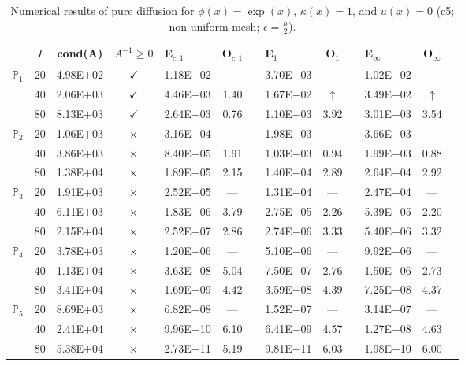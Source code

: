 \begin{table}[H]
\centering
\caption{Numerical results of pure diffusion for $\phi(x)=\exp(x)$, $\kappa(x)=1$, and $u(x)=0$ (c5; non-uniform mesh; $\epsilon=\frac{h}{2}$).}
\begin{tabular}{@{}l c c c l c c l c c l c c@{}}
\toprule
 & $I$ & cond(A) & $A^{-1}\geq 0$ &  E$_{c,1}$ & O$_{c,1}$ && E$_1$ & O$_1$ && E$_{\infty}$ & O$_{\infty}$\\
\midrule
\multirow{3}{*}{$\mathbb{P}_{1}$}
 & 20 & 4.98E$+$02 & $\checkmark$ & 1.18E$-$02 & --- && 3.70E$-$03 & --- && 1.02E$-$02 & ---\\
 & 40 & 2.06E$+$03 & $\checkmark$ & 4.46E$-$03 & 1.40 && 1.67E$-$02 & $\uparrow$ && 3.49E$-$02 & $\uparrow$\\
 & 80 & 8.13E$+$03 & $\checkmark$ & 2.64E$-$03 & 0.76 && 1.10E$-$03 & 3.92 && 3.01E$-$03 & 3.54\\
\midrule
\multirow{3}{*}{$\mathbb{P}_{2}$}
 & 20 & 1.06E$+$03 & $\times$ & 3.16E$-$04 & --- && 1.98E$-$03 & --- && 3.66E$-$03 & ---\\
 & 40 & 3.86E$+$03 & $\times$ & 8.40E$-$05 & 1.91 && 1.03E$-$03 & 0.94 && 1.99E$-$03 & 0.88\\
 & 80 & 1.38E$+$04 & $\times$ & 1.89E$-$05 & 2.15 && 1.40E$-$04 & 2.89 && 2.64E$-$04 & 2.92\\
\midrule
\multirow{3}{*}{$\mathbb{P}_{3}$}
 & 20 & 1.91E$+$03 & $\times$ & 2.52E$-$05 & --- && 1.31E$-$04 & --- && 2.47E$-$04 & ---\\
 & 40 & 6.11E$+$03 & $\times$ & 1.83E$-$06 & 3.79 && 2.75E$-$05 & 2.26 && 5.39E$-$05 & 2.20\\
 & 80 & 2.15E$+$04 & $\times$ & 2.52E$-$07 & 2.86 && 2.74E$-$06 & 3.33 && 5.40E$-$06 & 3.32\\
\midrule
\multirow{3}{*}{$\mathbb{P}_{4}$}
 & 20 & 3.78E$+$03 & $\times$ & 1.20E$-$06 & --- && 5.10E$-$06 & --- && 9.92E$-$06 & ---\\
 & 40 & 1.13E$+$04 & $\times$ & 3.63E$-$08 & 5.04 && 7.50E$-$07 & 2.76 && 1.50E$-$06 & 2.73\\
 & 80 & 3.41E$+$04 & $\times$ & 1.69E$-$09 & 4.42 && 3.59E$-$08 & 4.39 && 7.25E$-$08 & 4.37\\
\midrule
\multirow{3}{*}{$\mathbb{P}_{5}$}
 & 20 & 8.69E$+$03 & $\times$ & 6.82E$-$08 & --- && 1.52E$-$07 & --- && 3.14E$-$07 & ---\\
 & 40 & 2.41E$+$04 & $\times$ & 9.96E$-$10 & 6.10 && 6.41E$-$09 & 4.57 && 1.27E$-$08 & 4.63\\
 & 80 & 5.38E$+$04 & $\times$ & 2.73E$-$11 & 5.19 && 9.81E$-$11 & 6.03 && 1.98E$-$10 & 6.00\\
\bottomrule
\end{tabular}
\end{table}